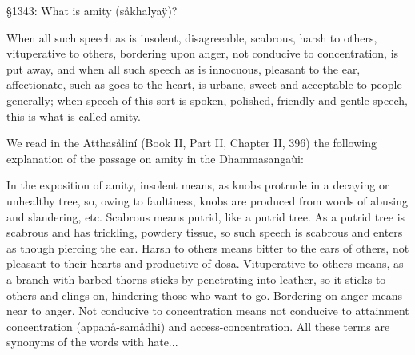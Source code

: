 \documentclass[12pt,twoside]{article}
\begin{document}
{\S}1343: What is amity (s{\aa}khalya\"y)?

When all such speech as is insolent, disagreeable, scabrous, harsh to
others, vituperative to others, bordering upon anger, not conducive to
concentration, is put away, and when all such speech as is innocuous,
pleasant to the ear, affectionate, such as goes to the heart, is
urbane, sweet and acceptable to people generally; when speech of this
sort is spoken, polished, friendly and gentle speech, this is what is
called amity. 


\bigskip

We read in the Atthas{\aa}lin\'i (Book II, Part II, Chapter II, 396) the
following explanation of the passage on amity in the Dhammasanga\`ui:


\bigskip

In the exposition of amity,
{\textasciigrave}{\textasciigrave}insolent{\textquotesingle}{\textquotesingle}
means, as knobs protrude in a decaying or unhealthy tree, so, owing to
faultiness, knobs are produced from words of abusing and slandering,
etc.
{\textasciigrave}{\textasciigrave}Scabrous{\textquotesingle}{\textquotesingle}
means putrid, like a putrid tree. As a putrid tree is scabrous and has
trickling, powdery tissue, so such speech is scabrous and enters as
though piercing the ear. {\textasciigrave}{\textasciigrave}Harsh to
others{\textquotesingle}{\textquotesingle} means bitter to the ears of
others, not pleasant to their hearts and productive of dosa.
{\textasciigrave}{\textasciigrave}Vituperative to
others{\textquotesingle}{\textquotesingle} means, as a branch with
barbed thorns sticks by penetrating into leather, so it sticks to
others and clings on, hindering those who want to go.
{\textasciigrave}{\textasciigrave}Bordering on
anger{\textquotesingle}{\textquotesingle} means near to anger.
{\textasciigrave}{\textasciigrave}Not conducive to
concentration{\textquotesingle}{\textquotesingle} means not conducive
to attainment concentration (appan{\aa}{}-sam{\aa}dhi) and
access{}-concentration. All these terms are synonyms of the words
{\textasciigrave}{\textasciigrave}with
hate{\textquotesingle}{\textquotesingle}... 
\end{document}
